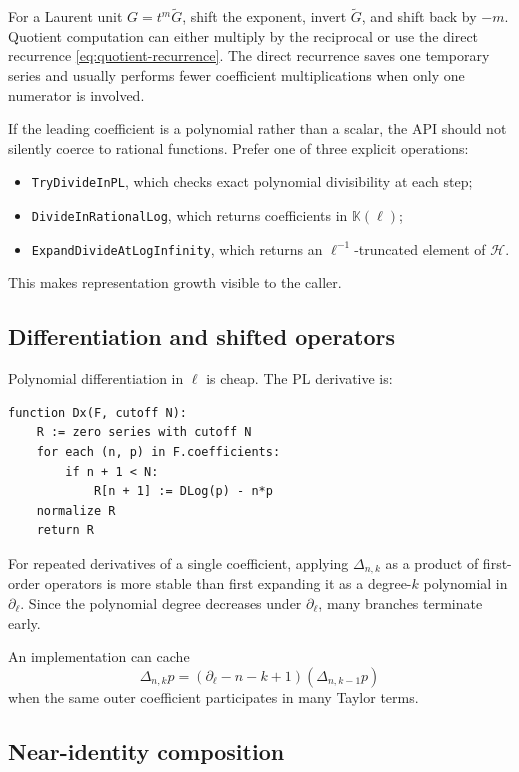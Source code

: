 \documentclass[11pt,oneside]{article}
\numberwithin{equation}{section}
\theoremstyle{definition}
\newcommand{\K}{\mathbb K}
\newcommand{\HL}{\mathscr H}
\newcommand{\dlog}{\partial_{\ell}}
\begin{document}
For a Laurent unit \(G=t^m\widetilde G\), shift the exponent, invert
\(\widetilde G\), and shift back by \(-m\).  Quotient computation can either
multiply by the reciprocal or use the direct recurrence
\eqref{eq:quotient-recurrence}.  The direct recurrence saves one temporary
series and usually performs fewer coefficient multiplications when only one
numerator is involved.

If the leading coefficient is a polynomial rather than a scalar, the API should
not silently coerce to rational functions.  Prefer one of three explicit
operations:
\begin{itemize}
\item \texttt{TryDivideInPL}, which checks exact polynomial divisibility at each
  step;
\item \texttt{DivideInRationalLog}, which returns coefficients in \(\K(\ell)\);
\item \texttt{ExpandDivideAtLogInfinity}, which returns an \(\ell^{-1}\)-truncated
  element of \(\HL\).
\end{itemize}
This makes representation growth visible to the caller.

\subsection{Differentiation and shifted operators}

Polynomial differentiation in \(\ell\) is cheap.  The PL derivative is:

\begin{lstlisting}[style=pseudocode,caption={Differentiation in the large variable \(x\).}]
function Dx(F, cutoff N):
    R := zero series with cutoff N
    for each (n, p) in F.coefficients:
        if n + 1 < N:
            R[n + 1] := DLog(p) - n*p
    normalize R
    return R
\end{lstlisting}

For repeated derivatives of a single coefficient, applying
\(\Delta_{n,k}\) as a product of first-order operators is more stable than first
expanding it as a degree-\(k\) polynomial in \(\dlog\).  Since the polynomial
degree decreases under \(\dlog\), many branches terminate early.

An implementation can cache
\[
  \Delta_{n,k}p=(\dlog-n-k+1)(\Delta_{n,k-1}p)
\]
when the same outer coefficient participates in many Taylor terms.

\subsection{Near-identity composition}
\end{document}
